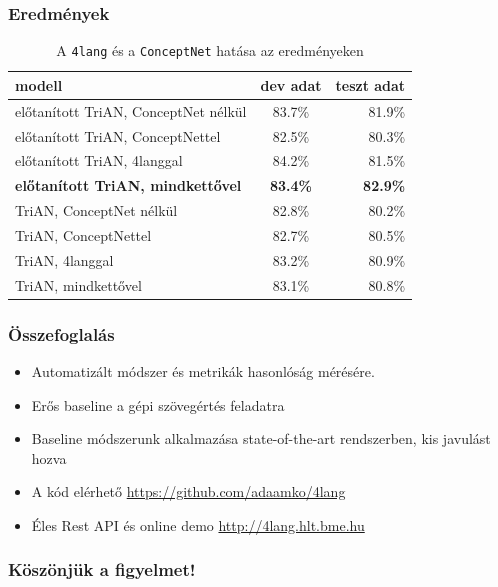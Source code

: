 \documentclass[bigger]{beamer}
\begin{document}
\begin{frame}
	\frametitle{Eredm\'enyek}
	\begin{table}[h!]
		\centering
		\begin{tabular}{ | l | c | r | }
			\hline
			modell & dev adat & teszt adat \\ \hline \hline
			\pause el\H{o}tan\'itott TriAN, ConceptNet n\'elk\"ul & 83.7\% & 81.9\% \pause \\ \hline
			el\H{o}tan\'itott TriAN, ConceptNettel & 82.5\% & 80.3\% \pause \\ \hline
			el\H{o}tan\'itott TriAN, 4langgal & 84.2\% & 81.5\% \pause \\ \hline
			\textbf{el\H{o}tan\'itott TriAN, mindkett\H{o}vel} & \textbf{83.4\%} & \textbf{82.9\%} \pause \\ \hline
			TriAN, ConceptNet n\'elk\"ul & 82.8\% & 80.2\% \pause \\ \hline
			TriAN, ConceptNettel & 82.7\% & 80.5\% \pause \\ \hline
			TriAN, 4langgal & 83.2\% & 80.9\% \pause \\ \hline
			TriAN, mindkett\H{o}vel & 83.1\% & 80.8\% \\ \hline
		\end{tabular}
		\caption{A \texttt{4lang} \'es a \texttt{ConceptNet} hat\'asa az eredm\'enyeken}
		\label{tabl:res}
	\end{table}
\end{frame}

\begin{frame}
\frametitle{Összefoglalás}
	\begin{itemize}
	    \pause \item Automatizált módszer és metrikák hasonlóság mérésére.
	    \pause \item Erős baseline a gépi szövegértés feladatra
	    \pause \item Baseline módszerunk alkalmazása state-of-the-art rendszerben, kis javulást hozva
	    \pause \item A kód elérhető \url{https://github.com/adaamko/4lang}
	    \pause \item Éles Rest API és online demo \url{http://4lang.hlt.bme.hu}
	\end{itemize}

\end{frame}
\begin{frame}
    \frametitle{K\"osz\"onj\"uk a figyelmet!}
    \AtNextBibliography{\tiny}
    \printbibliography
\end{frame}
\end{document}
